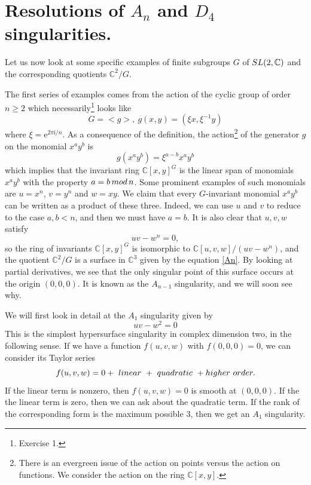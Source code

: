 \documentclass[11pt]{article}
\numberwithin{equation}{section}
\numberwithin{footnote}{section}
\newcommand{\blue}{\color{blue}}
\newcommand{\ee}{{\mathrm e}}
\newcommand{\ii}{{\mathrm i}}
\newcommand{\C}{{\mathbb C}}
\begin{document}
\section{Resolutions of $A_n$ and $D_4$ singularities.}\label{sec.ADE1}
Let us now look at some specific examples of finite subgroups $G$ of ${\rm SL}(2,\C)$ and the corresponding quotients $\C^2/G$.

\smallskip
The first series of examples comes from the action of the cyclic group of order $n\geq 2$ which necessarily\footnote{ Exercise 1.}
looks like
\begin{equation}\label{cyclic}
G=<g>,~g(x,y) =(\xi x, \xi^{-1} y)
\end{equation}
where $\xi = \ee^{2\pi \ii/n}$.
As a consequence of the definition, the action\footnote{ There is an evergreen issue of the action on points versus the action on functions. We consider the action on the ring $\C[x,y]$.} of the generator $g$ on the monomial $x^ay^b$ is 
$$
g(x^a y^b) = \xi^{a-b} x^ay^b
$$
which implies that the invariant ring $\C[x,y]^G$ is the linear span of monomials $x^ay^b$ with the property $a=b\,{\rm mod}\,n$.
Some prominent examples of such monomials are $u=x^n$, $v=y^n$ and $w=xy$. We claim that every $G$-invariant monomial $x^ay^b$ can be written as a product of these three. Indeed, we can use $u$ and $v$ to reduce to the case $a,b<n$, and then we must have $a=b$. It is also clear that $u,v,w$ satisfy
\begin{equation}\label{An}
uv-w^n = 0,
\end{equation}
so the ring of invariants $\C[x,y]^G$ is isomorphic to $\C[u,v,w]/(uv-w^n)$, and the quotient $\C^2/G$ is a surface in $\C^3$
given by the equation \eqref{An}.
By looking at partial derivatives, we see that the only singular point of this surface occurs at the origin $(0,0,0)$. It is known as the $A_{n-1}$ singularity, and we will soon see why.

\smallskip{\blue \hrule}
We will first look in detail at the $A_1$ singularity given by
\begin{equation}\label{A1}
uv-w^2=0
\end{equation}
This is the simplest hypersurface singularity in complex dimension two, in the following sense. If we have a function
$f(u,v,w)$ with $f(0,0,0)=0$, we can consider its Taylor series
$$
f(u,v,w) = 0 + {\rm ~linear~} + {\rm~ quadratic~} + {\rm higher~order.}
$$ 
If the linear term is nonzero, then $f(u,v,w)=0$ is smooth at $(0,0,0)$. If the the linear term is zero, then we can ask about the quadratic term. If the rank of the corresponding form is the maximum possible $3$, then we get an $A_1$ singularity.
\end{document}
